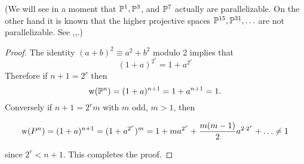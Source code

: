 \documentclass[../main]{subfiles}
\begin{document}
(We will see in a moment that $\mathbb{P}^{1}, \mathbb{P}^{3}$, and $\mathbb{P}^{7}$ actually are parallelizable. On the other hand it is known that the higher projective spaces $\mathbb{P}^{15}, \mathbb{P}^{31}, \ldots$ are not parallelizable. See \cite{bott-milnor1958},\cite{kervaire1958},\cite{adams1960}.) \label{problems page 47} %
\begin{proof}
The identity $(a+b)^{2} \equiv a^{2}+b^{2}$ modulo 2 implies that
\[
(1+a)^{2^{r}}=1+a^{2^{r}}
\]
Therefore if $n+1=2^{r}$ then
\[
\operatorname{w}(\mathbb{P}^{n})=(1+a)^{n+1}=1+a^{n+1}=1 .
\]
Conversely if $n+1=2^{r} m$ with $m$ odd, $m>1$, then

\[
 \operatorname{w}(P^{n})=(1+a)^{n+1}=(1+a^{2^{r}})^{m}  =1+m a^{2^{r}}+\frac{m(m-1)}{2} a^{2 \cdot 2^{r}}+\ldots \neq 1
\]

since $2^{r}<n+1$. This completes the proof.
\end{proof}
\end{document}
